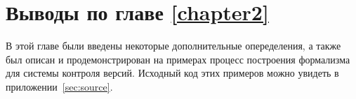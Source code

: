 \section{Выводы по главе \ref{chapter2}}

В этой главе были введены некоторые дополнительные опеределения, а
также был описан и продемонстрирован на примерах процесс построения
формализма для системы контроля версий. Исходный код этих примеров
можно увидеть в приложении~\ref{sec:source}.
